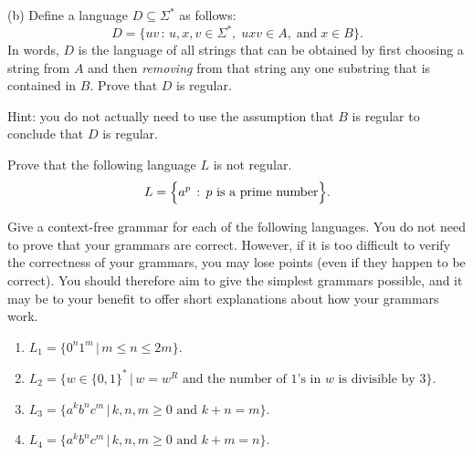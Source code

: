 \documentclass[11pt]{article}
\newenvironment{mylist}[1]{\begin{list}{}{
	\setlength{\leftmargin}{#1}
	\setlength{\rightmargin}{0mm}
	\setlength{\labelsep}{2mm}
	\setlength{\labelwidth}{8mm}
	\setlength{\itemsep}{0mm}}}
	{\end{list}}
\begin{document}
\begin{enumerate}
\begin{mylist}{8mm}
  \item[(b)]
    Define a language $D\subseteq\Sigma^{\ast}$ as follows:
    \[
    D = \bigl\{u v\,:\, u,x,v\in\Sigma^{\ast},\; uxv\in A,\;
    \text{and}\; x\in B\bigr\}.
    \]
    In words, $D$ is the language of all strings that can be obtained by first
    choosing a string from $A$ and then \emph{removing} from that string any
    one substring that is contained in $B$.
    Prove that $D$ is regular.
    
    \vspace{2mm}

    Hint: you do not actually need to use the assumption that $B$ is regular
    to conclude that $D$ is regular.

  \end{mylist}

\item Prove that the following language $L$ is not regular.
  \[
  L = \Bigl\{a^{p}\,:\,p \textrm{ is a prime number}\Bigr\}.
  \]
\item Give a context-free grammar for each of the following languages. You do not need to prove that your grammars are correct. However, if it is too difficult to verify the correctness of your grammars, you may lose points (even if they happen to be correct). You should therefore aim to give the simplest grammars possible, and it may be to your benefit to offer short explanations about how your grammars work.

\begin{enumerate}
\item $L_1 = \{0^n1^m  \, | \, m \leq n \leq 2m\}$.
\item $L_2 = \{w \in \{0,1\}^* \, | \, w = w^R \textrm{ and the number of $1$'s in $w$ is divisible by $3$}\}$.
\item $L_3 = \{a^k b^n c^m \, | \, k,n,m \geq 0 \textrm{ and } k+n=m\}$.
\item $L_4 = \{a^k b^n c^m \, | \, k,n,m \geq 0 \textrm{ and } k+m=n\}$.
\end{enumerate}
\end{enumerate}
\end{document}
